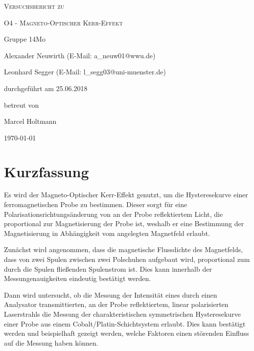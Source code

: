 \documentclass[
	a4paper,
	12pt,
	pagesize,
	ngerman
]{scrartcl}
\begin{document}
	
	\begin{titlepage}
		\centering
		{\scshape\LARGE Versuchsbericht zu \par}
		\vspace{1cm}
		{\scshape\huge O4 - Magneto-Optischer Kerr-Effekt \par}
		\vspace{2.5cm}
		{\LARGE Gruppe 14Mo \par}
		\vspace{0.5cm}
		
		{\large Alexander Neuwirth (E-Mail: a\_neuw01@wwu.de) \par}
		{\large Leonhard Segger (E-Mail: l\_segg03@uni-muenster.de) \par}
		\vfill
		
		durchgeführt am 25.06.2018\par
		betreut von\par
		{\large Marcel Holtmann}
		
		\vfill
		
		{\large \today\par}
	\end{titlepage}
	\tableofcontents
	\newpage

	\section{Kurzfassung}
	Es wird der Magneto-Optischer Kerr-Effekt genutzt, um die Hysteresekurve einer ferromagnetischen Probe zu bestimmen.
	Dieser sorgt für eine Polarisationsrichtungsänderung von an der Probe reflektiertem Licht, die proportional zur Magnetisierung der Probe ist, weshalb er eine Bestimmung der Magnetisierung in Abhängigkeit vom angelegten Magnetfeld erlaubt.
	
	Zunächst wird angenommen, dass die magnetische Flussdichte des Magnetfelds, dass von zwei Spulen zwischen zwei Polschuhen aufgebaut wird, proportional zum durch die Spulen fließenden Spulenstrom ist.
	Dies kann innerhalb der Messungenauigkeiten eindeutig bestätigt werden.
	
	Dann wird untersucht, ob die Messung der Intensität eines durch einen Analysator transmittierten, an der Probe reflektiertem, linear polarisierten Laserstrahls die Messung der charakteristischen symmetrischen Hysteresekurve einer Probe aus einem Cobalt/Platin-Schichtsystem erlaubt.
	Dies kann bestätigt werden und beispielhaft gezeigt werden, welche Faktoren einen störenden Einfluss auf die Messung haben können. %
	
\end{document}
